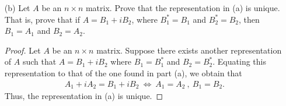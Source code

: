 \begin{enumerate}
\begin{proof}
        Now, we will show that \( A = {A}_{1} + i {A}_{2} \). Observe that
        \begin{align*}
           {A}_{1} + i {A}_{2} &= \frac{ 1 }{ 2 }  (A + A^{*}) + i \cdot \frac{ 1 }{ 2i  } (A - A^{*}) \\
                               &= \frac{ 1 }{ 2 }  A + \frac{ 1 }{ 2 }  A^{*} + \frac{ 1 }{ 2  } A -  \frac{ 1 }{ 2 }  A^{*} \\
                               &= A.
        \end{align*}
        Thus, we have \( A = {A}_{1} + i {A}_{2} \). This is a reasonable definition since we can just define the corresponds parts of the complex entries of \( A  \) as entries in \( \R  \) corresponding to two different matrices with each dedicated to the real and imaginary parts, respectively.
        \end{proof}
    \item[(b)] Let \( A  \) be an \( n \times n  \) matrix. Prove that the representation in (a) is unique. That is, prove that if \( A = {B}_{1} + i {B}_{2} \), where \( {B}_{1}^{*} = {B}_{1} \) and \( {B}_{2}^{*} = {B}_{2} \), then \( {B}_{1} = {A}_{1} \) and \( {B}_{2} = {A}_{2} \).
        \begin{proof}
        Let \( A  \) be an \( n \times n  \) matrix. Suppose there exists another representation of \( A  \) such that \( A = {B}_{1} + i {B}_{2}  \) where \( {B}_{1} = {B}_{1}^{*} \) and \( {B}_{2} = {B}_{2}^{*} \). Equating this representation to that of the one found in part (a), we obtain that
        \begin{align*}
            {A}_{1} + i {A}_{2} = {B}_{1} + i {B}_{2} \  \iff \ {A}_{1} = {A}_{2} \ , \ {B}_{1} = {B}_{2}.
        \end{align*}
        Thus, the representation in (a) is unique.
        \end{proof}
\end{enumerate}

